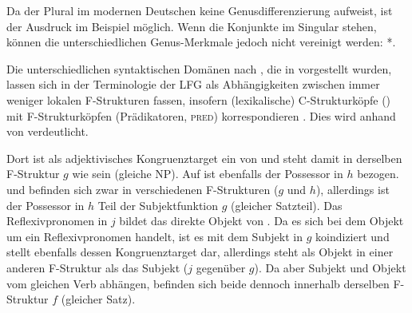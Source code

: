 Da der Plural im modernen Deutschen keine
Genusdifferenzierung aufweist, ist der Ausdruck im Beispiel möglich. Wenn die
Konjunkte im Singular stehen, können die unterschiedlichen Genus-Merkmale
jedoch nicht vereinigt werden: *.

Die unterschiedlichen syntaktischen Domänen nach
\citet[54]{corbett2006}, die in  vorgestellt wurden,
lassen sich in der Terminologie der LFG als Abhängigkeiten zwischen immer
weniger lokalen F-Strukturen fassen, insofern
(lexikalische) C-Strukturköpfe () mit
F-Strukturköpfen (Prädikatoren, \textsc{pred}) korrespondieren
\autocite[117]{bresnanetal2016}. Dies wird anhand von
 verdeutlicht.

Dort ist  als adjektivisches Kongruenztarget
ein  von  und steht damit in derselben
F-Struktur $g$ wie sein  (gleiche NP).
Auf  ist ebenfalls der Possessor  in $h$ bezogen.
 und  befinden sich zwar in verschiedenen
F-Strukturen ($g$ und $h$), allerdings ist der
Possessor in $h$ Teil der Subjektfunktion $g$ (gleicher Satzteil). Das
Reflexivpronomen  in $j$ bildet das direkte Objekt von . Da
es sich bei dem Objekt um ein Reflexivpronomen handelt, ist es mit dem Subjekt
in $g$ koindiziert und stellt ebenfalls dessen Kongruenztarget dar, allerdings
steht  als Objekt in einer anderen F-Struktur
als das Subjekt ($j$ gegenüber $g$). Da aber Subjekt und Objekt vom gleichen
Verb  abhängen, befinden sich beide dennoch innerhalb derselben
F-Struktur $f$ (gleicher Satz).

